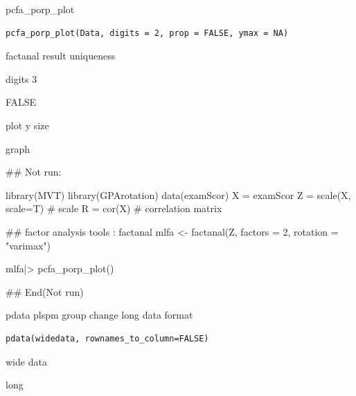\documentclass[a4paper]{book}
\begin{document}
%
\begin{Description}
pcfa\_porp\_plot
\end{Description}
%
\begin{Usage}
\begin{verbatim}
pcfa_porp_plot(Data, digits = 2, prop = FALSE, ymax = NA)
\end{verbatim}
\end{Usage}
%
\begin{Arguments}
\begin{ldescription}
\item[\code{Data}] factanal result uniqueness

\item[\code{digits}] digits 3

\item[\code{prop}] FALSE

\item[\code{ymax}] plot y size
\end{ldescription}
\end{Arguments}
%
\begin{Value}
graph
\end{Value}
%
\begin{Examples}
\begin{ExampleCode}
\#\# Not run: 

library(MVT)
library(GPArotation)
data(examScor)
X = examScor
Z = scale(X, scale=T)  # scale
R = cor(X)  # correlation matrix

## factor analysis tools : factanal
mlfa <- factanal(Z, factors = 2, rotation = "varimax")

mlfa|> pcfa_porp_plot()


## End(Not run)
\end{ExampleCode}
\end{Examples}

%
\begin{Description}
pdata plspm group change long data format
\end{Description}
%
\begin{Usage}
\begin{verbatim}
pdata(widedata, rownames_to_column=FALSE)
\end{verbatim}
\end{Usage}
%
\begin{Arguments}
\begin{ldescription}
\item[\code{data}] wide data
\end{ldescription}
\end{Arguments}
%
\begin{Value}
long
\end{Value}
\end{document}
